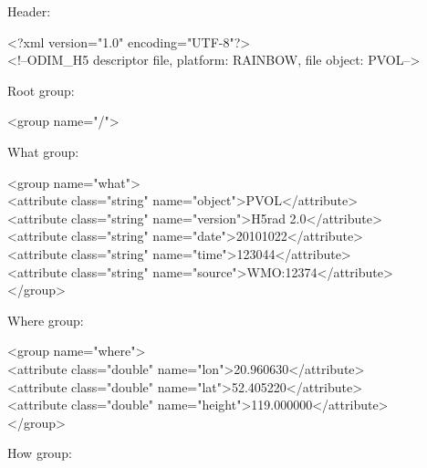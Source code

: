 \documentclass[11p]{article}
\begin{document}
Header:
\begin{kod}
<?xml version="1.0" encoding="UTF-8"?>\\
<!--ODIM\_H5 descriptor file, platform: RAINBOW, file object: PVOL-->\\
\end{kod}
Root group:
\begin{kod}
<group name="/">\\
\end{kod}
What group:
\begin{kod}
    <group name="what">\\
\hspace*{0.5cm}<attribute class="string" name="object">PVOL</attribute>\\
\hspace*{0.5cm}<attribute class="string" name="version">H5rad 2.0</attribute>\\
\hspace*{0.5cm}<attribute class="string" name="date">20101022</attribute>\\
\hspace*{0.5cm}<attribute class="string" name="time">123044</attribute>\\
\hspace*{0.5cm}<attribute class="string" name="source">WMO:12374</attribute>\\
    </group>\\
\end{kod}
Where group:
\begin{kod}
    <group name="where">\\
\hspace*{0.5cm}<attribute class="double" name="lon">20.960630</attribute>\\
\hspace*{0.5cm}<attribute class="double" name="lat">52.405220</attribute>\\
\hspace*{0.5cm}<attribute class="double" name="height">119.000000</attribute>\\
    </group>\\
\end{kod}
How group:
\end{document}
